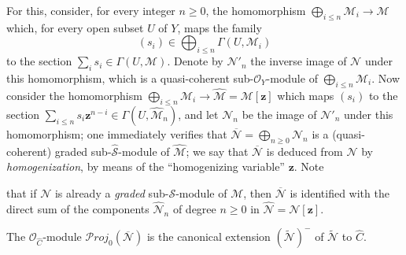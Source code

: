 \begin{env}[8.13.2]
\label{II.8.13.2}
For this, consider, for every integer $n\geqslant0$, the homomorphism
$\bigoplus_{i\leqslant n}\mathcal{M}_i\to\mathcal{M}$ which, for every open
subset $U$ of $Y$, maps the family
\[
  (s_i)\in\bigoplus_{i\leqslant n}\Gamma(U,\mathcal{M}_i)
\]
to the section $\sum_i s_i\in\Gamma(U,\mathcal{M})$. Denote by
$\mathcal{N}'_n$ the inverse image of $\mathcal{N}$ under this homomorphism,
which is a quasi-coherent sub-$\mathcal{O}_Y$-module of
$\bigoplus_{i\leqslant n}\mathcal{M}_i$. Now consider the
homomorphism
$\bigoplus_{i\leqslant n}\mathcal{M}_i\to
\widehat{\mathcal{M}}=\mathcal{M}[\mathbf{z}]$ which maps $(s_i)$ to the
section
$\sum_{i\leqslant n}s_i \mathbf{z}^{n-i}\in\Gamma(U,\widehat{\mathcal{M}}_n)$, and
let $\mathcal{N}_n$ be the image of $\mathcal{N}'_n$ under this homomorphism;
one immediately verifies that
$\overline{\mathcal{N}}=\bigoplus_{n\geqslant0}\mathcal{N}_n$ is a
(quasi-coherent) graded sub-$\widehat{\mathcal{S}}$-module of
$\widehat{\mathcal{M}}$; we say that $\overline{\mathcal{N}}$ is deduced from
$\mathcal{N}$ by \emph{homogenization}, by means of the ``homogenizing
variable'' $\mathbf{z}$. Note

that if $\mathcal{N}$ is already a \emph{graded} sub-$\mathcal{S}$-module of
$\mathcal{M}$, then $\overline{\mathcal{N}}$ is identified with the direct
sum of the components $\widehat{\mathcal{N}}_n$ of degree $n\geqslant0$ in
$\widehat{\mathcal{N}}=\mathcal{N}[\mathbf{z}]$.
\end{env}

\begin{proposition}[8.13.3]
\label{II.8.13.3}
The $\mathcal{O}_{\widehat{C}}$-module
$\mathcal{P}\mathit{roj}_0(\overline{\mathcal{N}})$ is the canonical extension
$(\widetilde{\mathcal{N}})^{-}$ of $\widetilde{\mathcal{N}}$ to
$\widehat{C}$.
\end{proposition}

